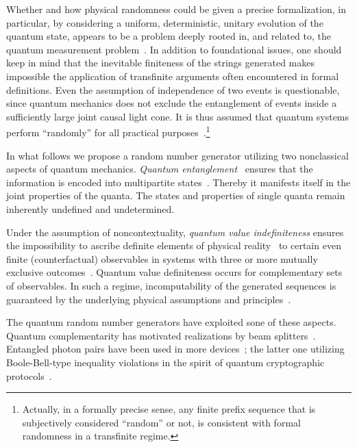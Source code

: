 \documentclass[%
 preprint,
 showpacs,
 showkeys,
 preprintnumbers,
  amsmath,amssymb,
  aps,
 pra,
  longbibliography,
  floatfix,
 ]{revtex4-1}
\theoremstyle{definition}
\begin{document}
Whether and how physical randomness could be given a precise formalization,
in particular, by considering a uniform, deterministic, unitary evolution of the quantum state,
appears to be a problem deeply rooted in, and related to, the quantum measurement problem~\cite{schroedinger-interpretation}.
In addition to foundational issues,
one should keep in mind that the inevitable finiteness of the strings generated makes impossible the application of transfinite arguments often encountered in formal definitions.
Even the assumption of independence of two events is questionable, since quantum mechanics does not exclude the
entanglement of events inside a sufficiently large joint causal light cone.
It is thus assumed that quantum systems perform ``randomly'' for all practical purposes~\cite{PhysRevA.82.022102}.\footnote{
Actually, in a formally precise sense, any finite prefix sequence that is subjectively considered ``random'' or not, is consistent with formal randomness in a transfinite regime.}


In what follows we propose a random number generator utilizing two nonclassical aspects of quantum mechanics.
{\em Quantum entanglement}~\cite{schrodinger,CambridgeJournals:1737068,CambridgeJournals:2027212} ensures that the information is encoded into multipartite states~\cite{zeil-99}.
Thereby it manifests itself in the joint properties of the quanta.
The states and properties of single quanta remain inherently undefined and undetermined.

Under the assumption of noncontextuality, {\em quantum value indefiniteness} ensures the impossibility to ascribe definite elements of physical reality~\cite{epr}
to certain even finite (counterfactual) observables in systems with three or more mutually exclusive outcomes~\cite{kochen1}.
Quantum value definiteness occurs for complementary sets of observables.
In such a regime, incomputability of the generated sequences is guaranteed by the underlying physical assumptions and principles~\cite{2008-cal-svo}.

The quantum random number generators  have exploited sone of these aspects.
Quantum complementarity has motivated realizations by
beam splitters~\cite{svozil-qct,rarity-94,zeilinger-epr-98,zeilinger:qct,stefanov-2000,wang:056107}.
Entangled photon pairs have been used in more devices~\cite{0256-307X-21-10-027,fiorentino:032334,10.1038/nature09008}; the latter one utilizing
Boole-Bell-type inequality violations
in the spirit of quantum cryptographic protocols~\cite{ekert91,PhysRevLett.85.3313}.
\end{document}
